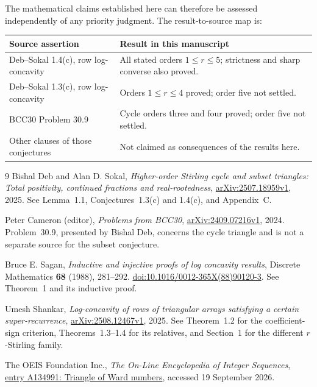 \documentclass[11pt,a4paper]{article}
\numberwithin{equation}{section}
\theoremstyle{definition}
\theoremstyle{remark}
\begin{document}
The mathematical claims established here can therefore be assessed
independently of any priority judgment. The result-to-source map is:
\begin{center}
\small
\renewcommand{\arraystretch}{1.25}
\begin{tabular}{>{\raggedright\arraybackslash}p{}>{\raggedright\arraybackslash}p{}}
\toprule
Source assertion & Result in this manuscript\\
\midrule
Deb--Sokal 1.4(c), row log-concavity & All stated orders $1\le r\le5$;
strictness and sharp converse also proved.\\
Deb--Sokal 1.3(c), row log-concavity & Orders $1\le r\le4$ proved;
order five not settled.\\
BCC30 Problem 30.9 & Cycle orders three and four proved;
order five not settled.\\
Other clauses of those conjectures & Not claimed as consequences of the results here.\\
\bottomrule
\end{tabular}
\end{center}

\begin{thebibliography}{9}
Bishal Deb and Alan D. Sokal,
\emph{Higher-order Stirling cycle and subset triangles: Total positivity,
continued fractions and real-rootedness},
\href{https://arxiv.org/abs/2507.18959}{arXiv:2507.18959v1}, 2025.
See Lemma~1.1, Conjectures~1.3(c) and 1.4(c), and Appendix~C.

Peter Cameron (editor), \emph{Problems from BCC30},
\href{https://arxiv.org/abs/2409.07216}{arXiv:2409.07216v1}, 2024.
Problem~30.9, presented by Bishal Deb, concerns the cycle triangle and is
not a separate source for the subset conjecture.

Bruce E. Sagan, \emph{Inductive and injective proofs of log concavity results},
Discrete Mathematics \textbf{68} (1988), 281--292.
\href{https://doi.org/10.1016/0012-365X(88)90120-3}{doi:10.1016/0012-365X(88)90120-3}.
See Theorem~1 and its inductive proof.

Umesh Shankar, \emph{Log-concavity of rows of triangular arrays satisfying
a certain super-recurrence},
\href{https://arxiv.org/abs/2508.12467}{arXiv:2508.12467v1}, 2025.
See Theorem~1.2 for the coefficient-sign criterion, Theorems~1.3--1.4 for
its relatives, and Section~1 for the different $r$-Stirling family.

The OEIS Foundation Inc., \emph{The On-Line Encyclopedia of Integer Sequences},
\href{https://oeis.org/A134991}{entry A134991: Triangle of Ward numbers},
accessed 19 September 2026.
\end{thebibliography}
\end{document}
